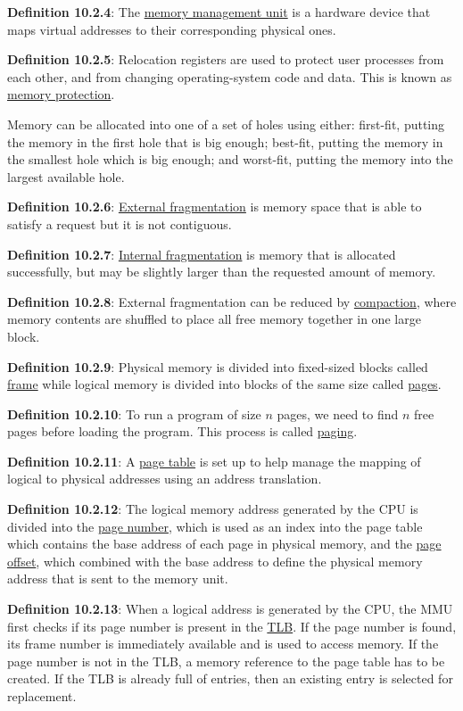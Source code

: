 \documentclass{article}
\newcommand{\separate}[1] {\vspace{#1 pt}\noindent}
\newcommand{\definition}[2]{\textbf{Definition #1}: #2\label{def:#1}}
\begin{document}
\separate{7}\definition{10.2.4}{The \underline{memory management unit} is a hardware device that maps virtual addresses to their corresponding physical ones.}

\separate{7}\definition{10.2.5}{Relocation registers are used to protect user processes from each other, and from changing operating-system code and data. This is known as \underline{memory protection}.}

\separate{7}Memory can be allocated into one of a set of holes using either: first-fit, putting the memory in the first hole that is big enough; best-fit, putting the memory in the smallest hole which is big enough; and worst-fit, putting the memory into the largest available hole.

\separate{7}\definition{10.2.6}{\underline{External fragmentation} is memory space that is able to satisfy a request but it is not contiguous.}

\separate{7}\definition{10.2.7}{\underline{Internal fragmentation} is memory that is allocated successfully, but may be slightly larger than the requested amount of memory.}

\separate{7}\definition{10.2.8}{External fragmentation can be reduced by \underline{compaction}, where memory contents are shuffled to place all free memory together in one large block.}

\separate{7}\definition{10.2.9}{Physical memory is divided into fixed-sized blocks called \underline{frame} while logical memory is divided into blocks of the same size called \underline{pages}.}

\separate{7}\definition{10.2.10}{To run a program of size \(n\) pages, we need to find \(n\) free pages before loading the program. This process is called \underline{paging}.}

\separate{7}\definition{10.2.11}{A \underline{page table} is set up to help manage the mapping of logical to physical addresses using an address translation.}

\separate{7}\definition{10.2.12}{The logical memory address generated by the CPU is divided into the \underline{page number}, which is used as an index into the page table which contains the base address of each page in physical memory, and the \underline{page offset}, which combined with the base address to define the physical memory address that is sent to the memory unit.}

\separate{7}\definition{10.2.13}{When a logical address is generated by the CPU, the MMU first checks if its page number is present in the \underline{TLB}. If the page number is found, its frame number is immediately available and is used to access memory. If the page number is not in the TLB, a memory reference to the page table has to be created. If the TLB is already full of entries, then an existing entry is selected for replacement.}
\end{document}
